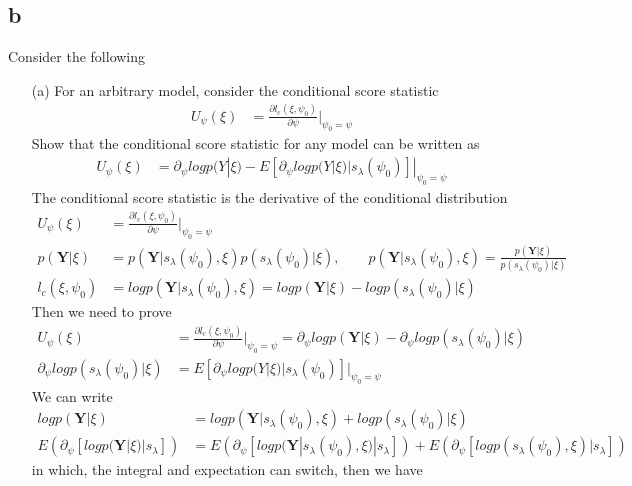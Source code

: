 \subsection{b}Consider the following
\begin{itemize}
	\item[(a)] For an arbitrary model, consider the conditional score statistic
	\begin{align*}
		U_{\psi}(\xi) &= \frac{\partial l_c(\xi, \psi_0)}{\partial \psi} |_{\psi_0=\psi}
	\end{align*} 
	Show that the conditional score statistic for any model can be written as
	\begin{align*}
		U_{\psi}(\xi) &= \partial_{\psi} log p(Y|\xi)- E[\partial_{\psi} log p(Y|\xi)|s_{\lambda}(\psi_0)]|_{\psi_0=\psi}
	\end{align*} 
	The conditional score statistic is the derivative of the conditional distribution
	\begin{align*}
		U_{\psi}(\xi) &= \frac{\partial l_c(\xi, \psi_0)}{\partial \psi} |_{\psi_0=\psi}\\
		p(\textbf{Y}| \xi) &= p(\textbf{Y}|s_{\lambda}(\psi_0), \xi) p(s_{\lambda}(\psi_0) | \xi), \qquad p(\textbf{Y}|s_{\lambda}(\psi_0), \xi) = \frac{p(\textbf{Y}| \xi)}{p(s_{\lambda}(\psi_0) | \xi)} \\
		l_c(\xi, \psi_0) &= log p(\textbf{Y}|s_{\lambda}(\psi_0), \xi)= log p(\textbf{Y}| \xi) - log p(s_{\lambda}(\psi_0) | \xi)
	\end{align*}
	Then we need to prove 
	\begin{align*}
		U_{\psi}(\xi) &= \frac{\partial l_c(\xi, \psi_0)}{\partial \psi} |_{\psi_0=\psi} = \partial_{\psi} log p(\textbf{Y}| \xi) - \partial_{\psi} log p(s_{\lambda}(\psi_0) | \xi)\\
		\partial_{\psi} log p(s_{\lambda}(\psi_0) | \xi) &= E[\partial_{\psi} log p(Y|\xi)|s_{\lambda}(\psi_0)]|_{\psi_0=\psi}
	\end{align*}
	We can write
	\begin{align*}
		log p(\textbf{Y}| \xi) &= log  p(\textbf{Y}|s_{\lambda}(\psi_0), \xi) + log p(s_{\lambda}(\psi_0) | \xi)\\
		E \left( \partial_{\psi}[log p(\textbf{Y}| \xi)| s_{\lambda}]\right) &= E \left(\partial_{\psi}[log  p(\textbf{Y}|s_{\lambda}(\psi_0), \xi)|s_{\lambda}]\right) + E \left(\partial_{\psi}[log p(s_{\lambda}(\psi_0), \xi)|s_{\lambda}]\right)
	\end{align*}    
	in which, the integral and expectation can switch, then we have

\end{itemize}
